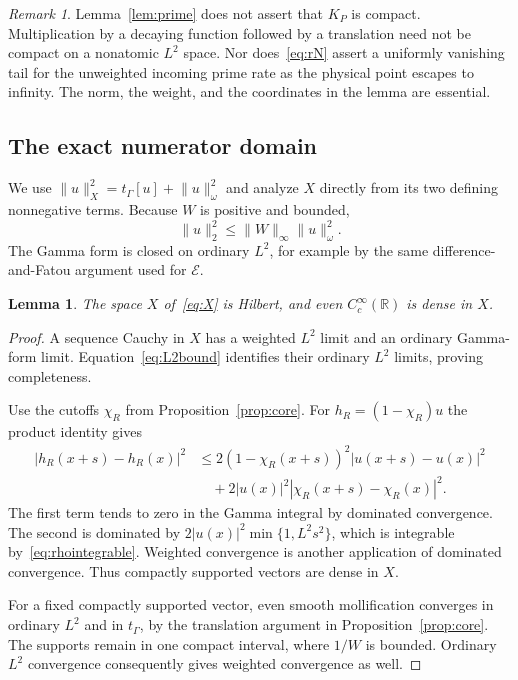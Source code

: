 \documentclass[11pt,a4paper]{article}
\numberwithin{equation}{section}
\newtheorem{lemma}[theorem]{Lemma}
\theoremstyle{definition}
\theoremstyle{remark}
\newtheorem{remark}[theorem]{Remark}
\newcommand{\R}{\mathbb R}
\newcommand{\E}{\mathcal E}
\newcommand{\tg}{t_{\Gamma}}
\newcommand{\norm}[1]{\lVert #1\rVert}
\begin{document}
\begin{remark}
Lemma~\ref{lem:prime} does not assert that $K_P$ is compact. Multiplication by a decaying function followed by a translation need not be compact on a nonatomic $L^2$ space. Nor does~\eqref{eq:rN} assert a uniformly vanishing tail for the unweighted incoming prime rate as the physical point escapes to infinity. The norm, the weight, and the coordinates in the lemma are essential.
\end{remark}

\subsection{The exact numerator domain}\label{sec:domain}

We use $\norm u_X^2=\tg[u]+\norm u_\omega^2$ and analyze $X$ directly from its two defining nonnegative terms. Because $W$ is positive and bounded,
\begin{equation}\label{eq:L2bound}
 \norm{u}_2^2\le\norm{W}_\infty\norm{u}_\omega^2.
\end{equation}
The Gamma form is closed on ordinary $L^2$, for example by the same difference-and-Fatou argument used for $\E$.

\begin{lemma}\label{lem:Xcore}
The space $X$ of~\eqref{eq:X} is Hilbert, and even $C_c^\infty(\R)$ is dense in $X$.
\end{lemma}
\begin{proof}
A sequence Cauchy in $X$ has a weighted $L^2$ limit and an ordinary Gamma-form limit. Equation~\eqref{eq:L2bound} identifies their ordinary $L^2$ limits, proving completeness.

Use the cutoffs $\chi_R$ from Proposition~\ref{prop:core}. For $h_R=(1-\chi_R)u$ the product identity gives
\begin{align*}
 |h_R(x+s)-h_R(x)|^2
 &\le2(1-\chi_R(x+s))^2|u(x+s)-u(x)|^2\\
 &\quad+2|u(x)|^2|\chi_R(x+s)-\chi_R(x)|^2.
\end{align*}
The first term tends to zero in the Gamma integral by dominated convergence. The second is dominated by
$2|u(x)|^2\min\{1,L^2s^2\}$, which is integrable by~\eqref{eq:rhointegrable}. Weighted convergence is another application of dominated convergence. Thus compactly supported vectors are dense in $X$.

For a fixed compactly supported vector, even smooth mollification converges in ordinary $L^2$ and in $\tg$, by the translation argument in Proposition~\ref{prop:core}. The supports remain in one compact interval, where $1/W$ is bounded. Ordinary $L^2$ convergence consequently gives weighted convergence as well.
\end{proof}
\end{document}
